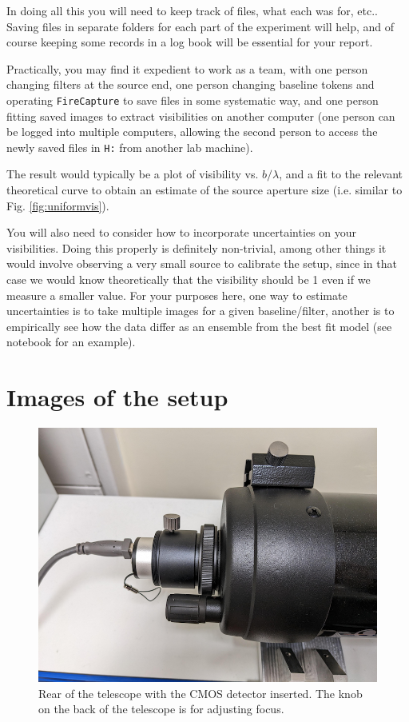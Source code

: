 \documentclass[11pt]{article}
\begin{document}
In doing all this you will need to keep track of files, what each was for, etc.. Saving files in separate folders for each part of the experiment will help, and of course keeping some records in a log book will be essential for your report.

Practically, you may find it expedient to work as a team, with one person changing filters at the source end, one person changing baseline tokens and operating \texttt{FireCapture} to save files in some systematic way, and one person fitting saved images to extract visibilities on another computer (one person can be logged into multiple computers, allowing the second person to access the newly saved files in \texttt{H:} from another lab machine).

The result would typically be a plot of visibility vs. $b/\lambda$, and a fit to the relevant theoretical curve to obtain an estimate of the source aperture size (i.e. similar to Fig. \ref{fig:uniformvis}).

You will also need to consider how to incorporate uncertainties on your visibilities. Doing this properly is definitely non-trivial, among other things it would involve observing a very small source to calibrate the setup, since in that case we would know theoretically that the visibility should be 1 even if we measure a smaller value. For your purposes here, one way to estimate uncertainties is to take multiple images for a given baseline/filter, another is to empirically see how the data differ as an ensemble from the best fit model (see notebook for an example).

\clearpage
\appendix

\section{Images of the setup}

\begin{figure}[h]
    \centering
    \includegraphics[width=1\textwidth]{doc/tel.png}
    \caption{Rear of the telescope with the CMOS detector inserted. The knob on the back of the telescope is for adjusting focus.}
    \label{fig:tel}
\end{figure}
\end{document}
